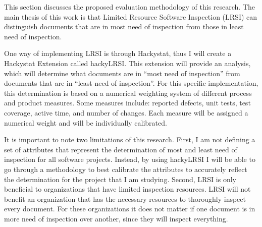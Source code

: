 
\label{sec:evaluation}
This section discusses the proposed evaluation methodology of this
research. The main thesis of this work is that Limited Resource Software
Inspection (LRSI) can distinguish documents that are in most need of
inspection from those in least need of inspection.

One way of implementing LRSI is through Hackystat, thus I will create a
Hackystat Extension called hackyLRSI. This extension will provide an
analysis, which will determine what documents are in ``most need of
inspection'' from documents that are in ``least need of inspection''. For
this specific implementation, this determination is based on a numerical
weighting system of different process and product measures. Some measures
include: reported defects, unit tests, test coverage, active time, and
number of changes. Each measure will be assigned a numerical weight and
will be individually calibrated.

It is important to note two limitations of this research. First, I am not
defining a set of attributes that represent the determination of most and
least need of inspection for all software projects. Instead, by using
hackyLRSI I will be able to go through a methodology to best calibrate the
attributes to accurately reflect the determination for the project that I
am studying. Second, LRSI is only beneficial to organizations that have
limited inspection resources. LRSI will not benefit an organization that
has the necessary resources to thoroughly inspect every document. For these
organizations it does not matter if one document is in more need of
inspection over another, since they will inspect everything.

\hspace*{1pt}

